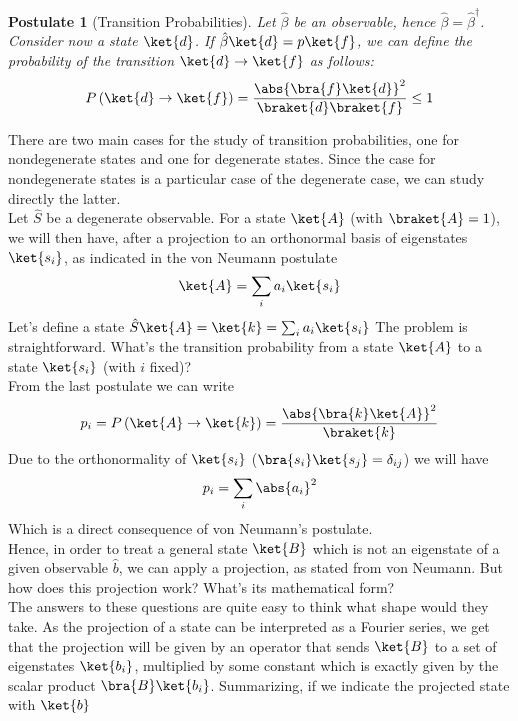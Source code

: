 \documentclass[a4paper, 11pt]{book}
\newcommand{\1}{\opr{\mathds{1}}}
\newcommand{\opr}[1]{\hat{#1}}
\newcommand{\adj}[2][]{#2^{\dagger#1}}
\newtheorem{pos}{Postulate}
\theoremstyle{plain}
\begin{document}
	\begin{pos}[Transition Probabilities]
		Let $\opr{\beta}$ be an observable, hence $\opr{\beta}=\adj{\opr{\beta}}$. Consider now a state $\ket{d}$. If $\opr{\beta}\ket{d}=p\ket{f}$, we can define the probability of the transition $\ket{d}\to\ket{f}$ as follows:
		\begin{equation*}
			P\left( \ket{d}\to\ket{f} \right)=\frac{\abs{\bra{f}\ket{d}}^2}{\braket{d}\braket{f}}\le1
		\end{equation*}
	\end{pos}
	There are two main cases for the study of transition probabilities, one for nondegenerate states and one for degenerate states. Since the case for nondegenerate states is a particular case of the degenerate case, we can study directly the latter.\\
	Let $\opr{S}$ be a degenerate observable. For a state $\ket{A}$ (with $\braket{A}=1$), we will then have, after a projection to an orthonormal basis of eigenstates $\ket{s_i}$, as indicated in the von Neumann postulate
	\begin{equation*}
		\ket{A}=\sum_ia_i\ket{s_i}
	\end{equation*}
	Let's define a state $\opr{S}\ket{A}=\ket{k}=\sum_ia_i\ket{s_i}$
	The problem is straightforward. What's the transition probability from a state $\ket{A}$ to a state $\ket{s_i}$ (with $i$ fixed)?\\
	From the last postulate we can write
	\begin{equation*}
		p_i=P\left( \ket{A}\to\ket{k} \right)=\frac{\abs{\bra{k}\ket{A}}^2}{\braket{k}}
	\end{equation*}
	Due to the orthonormality of $\ket{s_i}$ ($\bra{s_i}\ket{s_j}=\delta_{ij}$) we will have
	\begin{equation*}
		p_i=\sum_i\abs{a_i}^2
	\end{equation*}
	Which is a direct consequence of von Neumann's postulate.\\
	Hence, in order to treat a general state $\ket{B}$ which is not an eigenstate of a given observable $\opr{b}$, we can apply a projection, as stated from von Neumann. But how does this projection work? What's its mathematical form?\\
	The answers to these questions are quite easy to think what shape would they take. As the projection of a state can be interpreted as a Fourier series, we get that the projection will be given by an operator that sends $\ket{B}$ to a set of eigenstates $\ket{b_i}$, multiplied by some constant which is exactly given by the scalar product $\bra{B}\ket{b_i}$. Summarizing, if we indicate the projected state with $\ket{b}$
\end{document}
